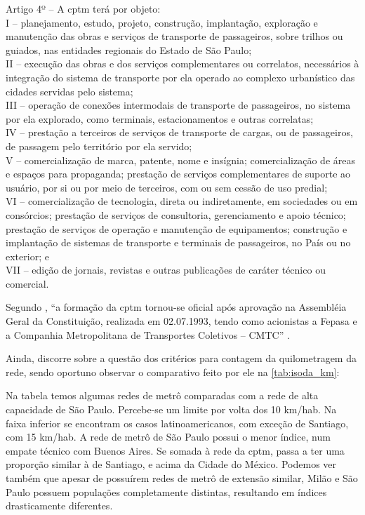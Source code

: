 \documentclass[11pt,fleqn]{book} %
\begin{document}
\begin{citacao}
	Artigo 4º -- A \gls{cptm} terá por objeto:\\
	I -- planejamento, estudo, projeto, construção, implantação, exploração e manutenção das obras e serviços de transporte de passageiros, sobre trilhos ou guiados, nas entidades regionais do Estado de São Paulo;\\
	II -- execução das obras e dos serviços complementares ou correlatos, necessários à integração do sistema de transporte por ela operado ao complexo urbanístico das cidades servidas pelo sistema; \\
	III --  operação de conexões intermodais de transporte de passageiros, no sistema por ela explorado, como terminais, estacionamentos e outras correlatas;\\
	IV -- prestação a terceiros de serviços de transporte de cargas, ou de passageiros, de passagem pelo território por ela servido;\\
	V -- comercialização de marca, patente, nome e insígnia; comercialização de áreas e espaços para propaganda; prestação de serviços complementares de suporte ao usuário, por si ou por meio de terceiros, com ou sem cessão de uso predial;\\
	VI -- comercialização de tecnologia, direta ou indiretamente, em sociedades ou em consórcios; prestação de serviços de consultoria, gerenciamento e apoio técnico; prestação de serviços de operação e manutenção de equipamentos; construção e implantação de sistemas de transporte e terminais de passageiros, no País ou no exterior; e\\
	VII -- edição de jornais, revistas e outras publicações de caráter técnico ou comercial. \cite{lei7861}
\end{citacao}

Segundo \citeauthor{Stefani}, ``a formação da \gls{cptm} tornou-se oficial após aprovação na Assembléia Geral da Constituição, realizada em 02.07.1993, tendo como acionistas a Fepasa e a Companhia Metropolitana de Transportes Coletivos – CMTC'' \cite[p. 236]{Stefani}.

Ainda, \citeauthor{Isoda} discorre sobre a questão dos critérios para contagem da quilometragem da rede, sendo oportuno observar o comparativo feito por ele na \autoref{tab:isoda_km}:

\begin{citacao}
	Na tabela temos algumas redes de metrô comparadas com a rede de alta capacidade de São Paulo. Percebe-se um limite por volta dos 10 km/hab. Na faixa inferior se encontram os casos latinoamericanos, com exceção de Santiago, com 15 km/hab. A rede de metrô de São Paulo possui o menor índice, num empate técnico com Buenos Aires. Se somada à rede da \gls{cptm}, passa a ter uma proporção similar à de Santiago, e acima da Cidade do México. Podemos ver também que apesar de possuírem redes de metrô de extensão similar, Milão e São Paulo possuem populações completamente distintas, resultando em índices drasticamente diferentes. \cite[p. 42]{Isoda}
\end{citacao}
\end{document}
